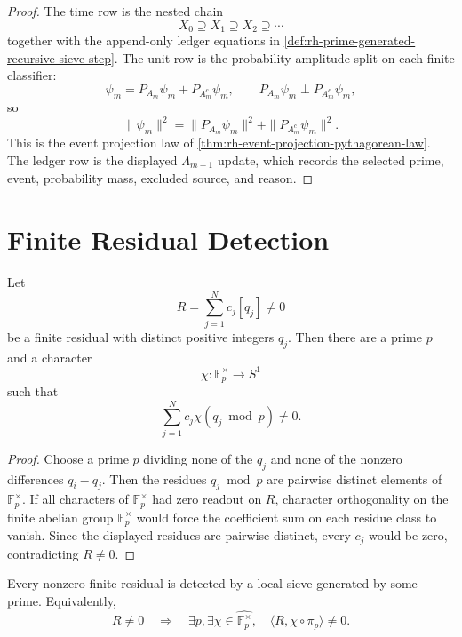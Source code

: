 \begin{proof}
The time row is the nested chain
$$
X_0\supseteq X_1\supseteq X_2\supseteq\cdots
$$
together with the append-only ledger equations in
\autoref{def:rh-prime-generated-recursive-sieve-step}.  The unit row is
the probability-amplitude split on each finite classifier:
$$
\psi_m=P_{A_m}\psi_m+P_{A_m^c}\psi_m,
\qquad
P_{A_m}\psi_m\perp P_{A_m^c}\psi_m,
$$
so
$$
\|\psi_m\|^2
=
\|P_{A_m}\psi_m\|^2+\|P_{A_m^c}\psi_m\|^2.
$$
This is the event projection law of
\autoref{thm:rh-event-projection-pythagorean-law}.  The ledger row is
the displayed $\Lambda_{m+1}$ update, which records the selected prime,
event, probability mass, excluded source, and reason.
\end{proof}

\section{Finite Residual Detection}
\label{sec:rh-prime-generated-recursive-finite-detection}

\begin{theorem}
\label{thm:rh-prime-generated-recursive-sieve-detects-finite-residuals}
Let
$$
R=\sum_{j=1}^{N}c_j[q_j]\ne0
$$
be a finite residual with distinct positive integers $q_j$.  Then there
are a prime $p$ and a character
$$
\chi:\mathbb F_p^\times\to S^1
$$
such that
$$
\sum_{j=1}^{N}c_j\chi(q_j\bmod p)\ne0.
$$
\end{theorem}

\begin{proof}
Choose a prime $p$ dividing none of the $q_j$ and none of the nonzero
differences $q_i-q_j$.  Then the residues $q_j\bmod p$ are pairwise
distinct elements of $\mathbb F_p^\times$.  If all characters of
$\mathbb F_p^\times$ had zero readout on $R$, character orthogonality
on the finite abelian group $\mathbb F_p^\times$ would force the
coefficient sum on each residue class to vanish.  Since the displayed
residues are pairwise distinct, every $c_j$ would be zero, contradicting
$R\ne0$.
\end{proof}

\begin{corollary}
\label{cor:rh-prime-generated-recursive-completeness}
Every nonzero finite residual is detected by a local sieve generated by
some prime.  Equivalently,
$$
R\ne0
\quad\Rightarrow\quad
\exists p,\exists \chi\in\widehat{\mathbb F_p^\times},
\quad
\langle R,\chi\circ\pi_p\rangle\ne0.
$$
\end{corollary}


